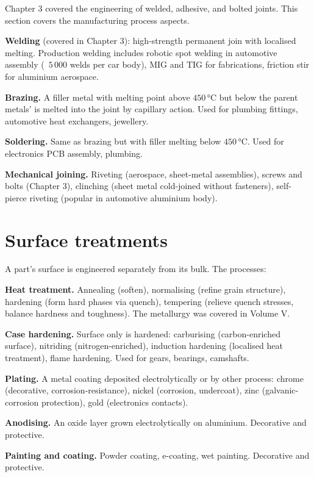 Chapter 3 covered the engineering of welded, adhesive, and bolted joints. This section covers the manufacturing process aspects.

\textbf{Welding} (covered in Chapter 3): high-strength permanent join with localised melting. Production welding includes robotic spot welding in automotive assembly (~$5\,000$ welds per car body), MIG and TIG for fabrications, friction stir for aluminium aerospace.

\textbf{Brazing.} A filler metal with melting point above $450\,\si{\degreeCelsius}$ but below the parent metals' is melted into the joint by capillary action. Used for plumbing fittings, automotive heat exchangers, jewellery.

\textbf{Soldering.} Same as brazing but with filler melting below $450\,\si{\degreeCelsius}$. Used for electronics PCB assembly, plumbing.

\textbf{Mechanical joining.} Riveting (aerospace, sheet-metal assemblies), screws and bolts (Chapter 3), clinching (sheet metal cold-joined without fasteners), self-pierce riveting (popular in automotive aluminium body).

\section{Surface treatments}

A part's surface is engineered separately from its bulk. The processes:

\textbf{Heat treatment.} Annealing (soften), normalising (refine grain structure), hardening (form hard phases via quench), tempering (relieve quench stresses, balance hardness and toughness). The metallurgy was covered in Volume V.

\textbf{Case hardening.} Surface only is hardened: carburising (carbon-enriched surface), nitriding (nitrogen-enriched), induction hardening (localised heat treatment), flame hardening. Used for gears, bearings, camshafts.

\textbf{Plating.} A metal coating deposited electrolytically or by other process: chrome (decorative, corrosion-resistance), nickel (corrosion, undercoat), zinc (galvanic-corrosion protection), gold (electronics contacts).

\textbf{Anodising.} An oxide layer grown electrolytically on aluminium. Decorative and protective.

\textbf{Painting and coating.} Powder coating, e-coating, wet painting. Decorative and protective.

